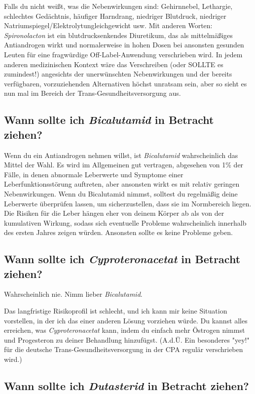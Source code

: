 \documentclass{article}
\begin{document}
Falls du nicht weißt, was die Nebenwirkungen sind: Gehirnnebel, Lethargie, schlechtes Gedächtnis, häufiger Harndrang, niedriger Blutdruck, niedriger Natriumspiegel/Elektrolytungleichgewicht usw. Mit anderen Worten: \textit{Spironolacton} ist ein blutdrucksenkendes Diuretikum, das als mittelmäßiges Antiandrogen wirkt und normalerweise in hohen Dosen bei ansonsten gesunden Leuten für eine fragwürdige Off-Label-Anwendung verschrieben wird. In jedem anderen medizinischen Kontext wäre das Verschreiben (oder SOLLTE es zumindest!) angesichts der unerwünschten Nebenwirkungen und der bereits verfügbaren, vorzuziehenden Alternativen höchst unratsam sein, aber so sieht es nun mal im Bereich der Trans-Gesundheitsversorgung aus.

\subsection{Wann sollte ich \textit{Bicalutamid} in Betracht ziehen?}

Wenn du ein Antiandrogen nehmen willst, ist \textit{Bicalutamid} wahrscheinlich das Mittel der Wahl. Es wird im Allgemeinen gut vertragen, abgesehen von 1\% der Fälle, in denen abnormale Leberwerte und Symptome einer Leberfunktionsstörung auftreten, aber ansonsten wirkt es mit relativ geringen Nebenwirkungen. Wenn du Bicalutamid nimmst, solltest du regelmäßig deine Leberwerte überprüfen lassen, um sicherzustellen, dass sie im Normbereich liegen. Die Risiken für die Leber hängen eher von deinem Körper ab als von der kumulativen Wirkung, sodass sich eventuelle Probleme wahrscheinlich innerhalb des ersten Jahres zeigen würden. Ansonsten sollte es keine Probleme geben.

\subsection{Wann sollte ich \textit{Cyproteronacetat} in Betracht ziehen?}

Wahrscheinlich nie. Nimm lieber \textit{Bicalutamid}.

Das langfristige Risikoprofil ist schlecht, und ich kann mir keine Situation vorstellen, in der ich das einer anderen Lösung vorziehen würde. Du kannst alles erreichen, was \textit{Cyproteronacetat} kann, indem du einfach mehr Östrogen nimmst und Progesteron zu deiner Behandlung hinzufügst. (A.d.Ü. Ein besonderes "yey!" für die deutsche Trans-Gesundheitsversorgung in der CPA regulär verschrieben wird.)

\subsection{Wann sollte ich \textit{Dutasterid} in Betracht ziehen?}
\end{document}
